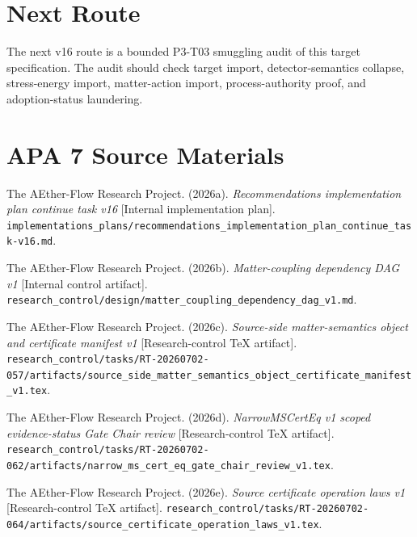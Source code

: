 \documentclass[11pt]{article}
\begin{document}
\section{Next Route}

The next v16 route is a bounded P3-T03 smuggling audit of this target
specification. The audit should check target import, detector-semantics
collapse, stress-energy import, matter-action import, process-authority proof,
and adoption-status laundering.

\section{APA 7 Source Materials}

The AEther-Flow Research Project. (2026a). \textit{Recommendations
implementation plan continue task v16} [Internal implementation plan].
\texttt{implementations\_plans/recommendations\_implementation\_plan\_continue\_task-v16.md}.

The AEther-Flow Research Project. (2026b). \textit{Matter-coupling dependency
DAG v1} [Internal control artifact].
\texttt{research\_control/design/matter\_coupling\_dependency\_dag\_v1.md}.

The AEther-Flow Research Project. (2026c). \textit{Source-side
matter-semantics object and certificate manifest v1} [Research-control TeX
artifact].
\texttt{research\_control/tasks/RT-20260702-057/artifacts/source\_side\_matter\_semantics\_object\_certificate\_manifest\_v1.tex}.

The AEther-Flow Research Project. (2026d). \textit{NarrowMSCertEq v1 scoped
evidence-status Gate Chair review} [Research-control TeX artifact].
\texttt{research\_control/tasks/RT-20260702-062/artifacts/narrow\_ms\_cert\_eq\_gate\_chair\_review\_v1.tex}.

The AEther-Flow Research Project. (2026e). \textit{Source certificate
operation laws v1} [Research-control TeX artifact].
\texttt{research\_control/tasks/RT-20260702-064/artifacts/source\_certificate\_operation\_laws\_v1.tex}.
\end{document}
